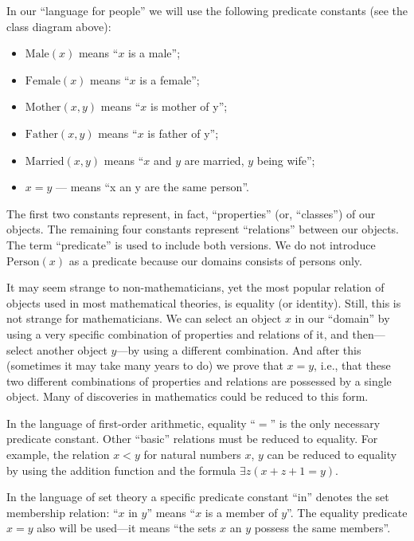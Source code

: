 \begin{ex}[]
In our ``language for people'' we will use the following predicate constants (see the class diagram above):
\begin{itemize}
    \item \(\mathrm{Male}(x)\) means ``\(x\) is a male'';
    \item \(\mathrm{Female}(x)\) means ``\(x\) is a female'';
    \item \(\mathrm{Mother}(x, y)\) means ``\(x\) is mother of y'';
    \item \(\mathrm{Father}(x, y)\) means ``\(x\) is father of y'';
    \item \(\mathrm{Married}(x, y)\) means ``\(x\) and \(y\) are married, \(y\) being wife'';
    \item \(x=y\) --- means ``x an y are the same person''.
\end{itemize}

The first two constants represent, in fact, ``properties'' (or, ``classes'') of our objects.
The remaining four constants represent ``relations'' between our objects.
The term ``predicate'' is used to include both versions.
We do not introduce \(\mathrm{Person}(x)\) as a predicate because our domains consists of persons only.
\end{ex}

\begin{ex}[]
It may seem strange to non-mathematicians, yet the most popular relation of objects used in most mathematical theories, is equality (or identity).
Still, this is not strange for mathematicians.
We can select an object \(x\) in our ``domain'' by using a very specific combination of properties and relations of it, and then---select another object \(y\)---by using a different combination.
And after this (sometimes it may take many years to do) we prove that \(x=y\), i.e., that these two different combinations of properties and relations are possessed by a single object.
Many of discoveries in mathematics could be reduced to this form.

In the language of first-order arithmetic, equality ``\(=\)'' is the only necessary predicate constant.
Other ``basic'' relations must be reduced to equality.
For example, the relation \(x<y\) for natural numbers \(x\), \(y\) can be reduced to equality by using the addition function and the formula \(\exists z(x+z+1=y)\).
\end{ex}

\begin{ex}[]
In the language of set theory a specific predicate constant ``in'' denotes the set membership relation: ``\(x\) in \(y\)'' means ``\(x\) is a member of \(y\)''.
The equality predicate \(x=y\) also will be used---it means ``the sets \(x\) an \(y\) possess the same members''.
\end{ex}


